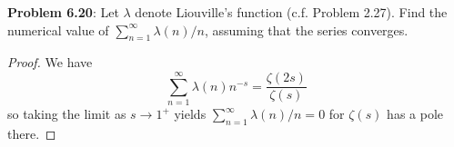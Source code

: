 \documentclass[12pt]{article}
\begin{document}
\fi

\textbf{Problem 6.20}: Let $\lambda$ denote Liouville's function (c.f. Problem 2.27). Find the numerical value of $\sum_{n=1}^{\infty} \lambda(n)/n$, assuming that the series converges.

\begin{proof}
We have
$$\sum_{n=1}^{\infty} \lambda(n) n^{-s} = \frac{\zeta(2s)}{\zeta(s)}$$
so taking the limit as $s \rightarrow 1^+$ yields
$\sum_{n=1}^{\infty} \lambda(n)/n = 0$
for $\zeta(s)$ has a pole there.
\end{proof}

\unless\ifdefined\IsMainDocument
\end{document}
